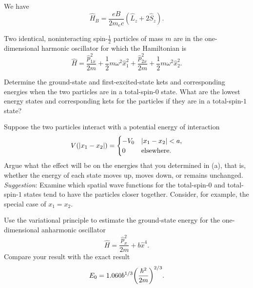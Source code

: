 \documentclass {../phys116}
\begin{document}
\begin {solution}
  We have
  \[
    \hat H_B = \frac {eB} {2 m_e c} (\hat L_z + 2 \hat S_z).
  \]

\end {solution}

\begin {exercise} 
  Two identical, noninteracting spin-\(\frac 1 2\) particles of mass
  \(m\) are in the one-dimensional harmonic oscillator for which the
  Hamiltonian is
  \[
    \hat H
    = \frac {\hat p_{1x}^2} {2m} + \frac 1 2 m \omega^2 \hat x_1^2
    + \frac {\hat p_{2x}^2} {2m} + \frac 1 2 m \omega^2 \hat x_2^2.
  \]
  \begin {problems}
  \item Determine the ground-state and first-excited-state kets and
    corresponding energies when the two particles are in a
    total-spin-\(0\) state.  What are the lowest energy states and
    corresponding kets for the particles if they are in a
    total-spin-\(1\) state?
  \item Suppose the two particles interact with a potential energy of
    interaction
    \[
      V(\lvert x_1 - x_2\rvert) =
      \begin {cases}
        -V_0 & \lvert x_1-x_2\rvert < a, \\
        0 & \text {elsewhere}.
      \end {cases}
    \]
    Argue what the effect will be on the energies that you determined
    in (a), that is, whether the energy of each state moves up, moves
    down, or remains unchanged.  \textit {Suggestion}: Examine which
    spatial wave functions for the total-spin-\(0\) and
    total-spin-\(1\) states tend to have the particles closer
    together.  Consider, for example, the special case of
    \(x_1 = x_2\).
  \end {problems}
\end {exercise}

\begin {solution}

\end {solution}

\begin {exercise} 
  Use the variational principle to estimate the ground-state energy
  for the one-dimensional anharmonic oscillator
  \[
    \hat H = \frac {\hat p_x^2} {2m} + b \hat x^4.
  \]
  Compare your result with the exact result
  \[
    E_0 = 1.060 b^{1/3} \prn* {\frac {\hbar^2} {2m}}^{2/3}.
  \]
\end {exercise}

\begin {solution}

\end {solution}
\end{document}
